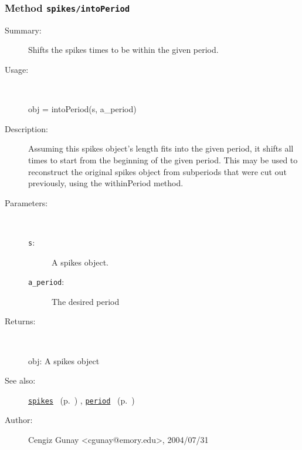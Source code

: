 \subsubsection[Method \texttt{intoPeriod}]{Method \texttt{spikes/intoPeriod}}%
%
\label{ref_spikes__intoPeriod}%
\hypertarget{ref_spikes__intoPeriod}{}%
\begin{description}
\item[Summary:]Shifts the spikes times to be within the given period.
%
\item[Usage:]~%
\begin{lyxcode}%
obj = intoPeriod(s, a\_period)
%
\end{lyxcode}%
%
\item[Description:]%
Assuming this spikes object's length fits into the given period, it shifts
 all times to start from the beginning of the given period. This may be used
 to reconstruct the original spikes object from subperiods that were cut out
 previously, using the withinPeriod method.
\item[Parameters:]~
\begin{description}%
\item[\texttt{s}:]
 A spikes object.
\item[\texttt{a\_period}:]
 The desired period 
\end{description}%
%
\item[Returns:
]~

	obj: A spikes object
%
%
\item[See also:]%
\hyperlink{ref_spikes}{\texttt{spikes}}%
\ (p.~\pageref{ref_spikes})%
%
, \hyperlink{ref_period}{\texttt{period}}%
\ (p.~\pageref{ref_period})%
%
%
\item[Author:]%
Cengiz Gunay <cgunay@emory.edu>, 2004/07/31
%
\end{description}
\methodline%
